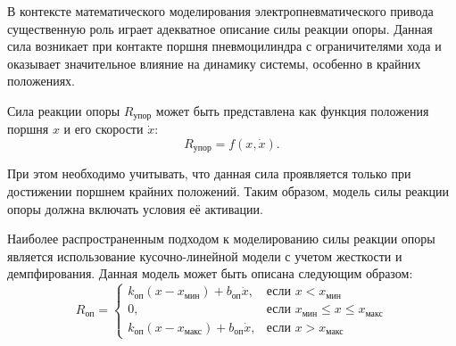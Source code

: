 В контексте математического моделирования электропневматического привода существенную роль играет
адекватное описание силы реакции опоры. Данная сила возникает при контакте поршня пневмоцилиндра
с ограничителями хода и оказывает значительное влияние на динамику системы, особенно в крайних положениях.

Сила реакции опоры $R_\text{упор}$ может быть представлена как функция положения поршня $x$ и его скорости $\dot{x}$:
\begin{equation}
    R_\text{упор} = f(x, \dot{x}).
\end{equation}

При этом необходимо учитывать, что данная сила проявляется только при достижении
поршнем крайних положений. Таким образом, модель силы реакции опоры должна включать
условия её активации.

Наиболее распространенным подходом к моделированию силы реакции опоры является использование кусочно-линейной модели с учетом жесткости и демпфирования. Данная модель может быть описана следующим образом:
\begin{equation}
\label{eq:ch2/support_reaction}
    R_\text{оп} = \begin{cases}
        k_\text{оп}(x - x_\text{мин}) + b_\text{оп}\dot{x},  & \text{если } x < x_\text{мин}                       \\
        0,                                                   & \text{если } x_\text{мин} \leq x \leq x_\text{макс} \\
        k_\text{оп}(x - x_\text{макс}) + b_\text{оп}\dot{x}, & \text{если } x > x_\text{макс}
    \end{cases}
\end{equation}
